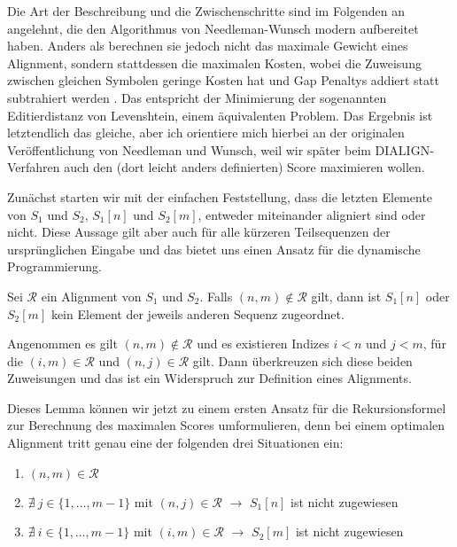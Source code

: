 Die Art der Beschreibung und die Zwischenschritte  sind im Folgenden an \cite[S.281ff.]{kt05} angelehnt, die den Algorithmus von Needleman-Wunsch modern aufbereitet haben. Anders als \cite{nw70} berechnen sie jedoch nicht das maximale Gewicht eines Alignment, sondern stattdessen die maximalen Kosten, wobei die Zuweisung zwischen gleichen Symbolen geringe Kosten hat und Gap Penaltys addiert statt subtrahiert werden \cite[S.281,Lemma 6.16]{kt05}. Das entspricht der Minimierung der sogenannten Editierdistanz von Levenshtein, einem äquivalenten Problem. Das Ergebnis ist letztendlich das gleiche, aber ich orientiere mich hierbei an der originalen Veröffentlichung von Needleman und Wunsch, weil wir später beim DIALIGN-Verfahren auch den (dort leicht anders definierten) Score maximieren wollen.

Zunächst starten wir mit der einfachen Feststellung, dass die letzten Elemente von $S_1$ und $S_2$, $S_1[n]$ und $S_2[m]$, entweder miteinander aligniert sind oder nicht. Diese Aussage gilt aber auch für alle kürzeren Teilsequenzen der ursprünglichen Eingabe und das bietet uns einen Ansatz für die dynamische Programmierung. 

\begin{lemma}[{\cite[S.281]{kt05}}]
	Sei $\mathcal{R}$ ein Alignment von $S_1$ und $S_2$. Falls $(n,m) \notin \mathcal{R}$ gilt, dann ist $S_1[n]$ oder $S_2[m]$ kein Element der jeweils anderen Sequenz zugeordnet. 
\end{lemma}

\begin{beweis}
	Angenommen es gilt $(n,m) \notin \mathcal{R}$ und es existieren Indizes $i < n$ und $j < m$, für die $(i,m) \in \mathcal{R}$ und $(n,j) \in \mathcal{R}$ gilt. Dann überkreuzen sich diese beiden Zuweisungen und das ist ein Widerspruch zur Definition eines  Alignments.
\end{beweis}

Dieses Lemma können wir jetzt zu einem ersten Ansatz für die Rekursionsformel zur Berechnung des maximalen Scores umformulieren, denn bei einem optimalen Alignment tritt genau eine der folgenden drei Situationen ein:

\begin{enumerate}[topsep=0pt,itemsep=-1ex,partopsep=1ex,parsep=1ex]
	\item $(n,m) \in \mathcal{R}$
	\item $\nexists\: j \in \{1,\dots,m-1\}$ mit $(n,j) \in \mathcal{R}$ \tab $\rightarrow$ $S_1[n]$ ist nicht zugewiesen
	\item $\nexists\: i \in \{1,\dots,m-1\}$ mit $(i,m) \in \mathcal{R}$ \tab $\rightarrow$ $S_2[m]$ ist nicht zugewiesen
\end{enumerate}

